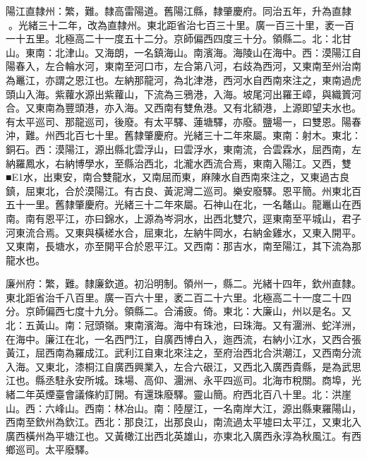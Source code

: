 \begin{pinyinscope}
陽江直隸州：繁，難。隸高雷陽道。舊陽江縣，隸肇慶府。同治五年，升為直隸。光緒三十二年，改為直隸州。東北距省治七百三十里。廣一百三十里，袤一百一十五里。北極高二十一度五十二分。京師偏西四度三十分。領縣二。北：北甘山。東南：北津山。又海朗，一名鎮海山。南濱海。海陵山在海中。西：漠陽江自陽春入，左合輪水河，東南至河口市，左合第八河，右歧為西河，又東南至州治南為鼉江，亦謂之恩江也。左納那龍河，為北津港，西河水自西南來注之，東南過虎頭山入海。紫蘿水源出紫蘿山，下流為三鴉港，入海。坡尾河出羅王嶂，與織篢河合。又東南為豐頭港，亦入海。又西南有雙魚港。又有北額港，上源即望夫水也。有太平巡司、那龍巡司，後廢。有太平驛、蓮塘驛，亦廢。鹽場一，曰雙恩。陽春沖，難。州西北百七十里。舊隸肇慶府。光緒三十二年來屬。東南：射木。東北：銅石。西：漠陽江，源出縣北雲浮山，曰雲浮水，東南流，合雲霖水，屈西南，左納羅鳳水，右納博學水，至縣治西北，北瀧水西流合焉，東南入陽江。又西，雙■E1水，出東安，南合雙龍水，又南屈而東，麻陳水自西南來注之，又東過古良鎮，屈東北，合於漠陽江。有古良、黃泥灣二巡司。樂安廢驛。恩平簡。州東北百五十一里。舊隸肇慶府。光緒三十二年來屬。石神山在北，一名鼇山。龍鼉山在西南。南有恩平江，亦曰錦水，上源為岑洞水，出西北雙穴，逕東南至平城山，君子河東流合焉。又東與橫槎水合，屈東北，左納牛岡水，右納金雞水，又東入開平。又東南，長塘水，亦至開平合於恩平江。又西南：那吉水，南至陽江，其下流為那龍水也。

廉州府：繁，難。隸廉欽道。初沿明制。領州一，縣二。光緒十四年，欽州直隸。東北距省治千八百里。廣一百六十里，袤二百二十六里。北極高二十一度二十四分。京師偏西七度十九分。領縣二。合浦疲。倚。東北：大廉山，州以是名。又北：五黃山。南：冠頭嶺。東南濱海。海中有珠池，曰珠海。又有潿洲、蛇洋洲，在海中。廉江在北，一名西門江，自廣西博白入，迤西流，右納小江水，又西合張黃江，屈西南為羅成江。武利江自東北來注之，至府治西北合洪潮江，又西南分流入海。又東北，漆桐江自廣西興業入，左合六硍江，又西北入廣西貴縣，是為武思江也。縣丞駐永安所城。珠場、高仰、潿洲、永平四巡司。北海市稅關。商埠，光緒二年英煙臺會議條約訂開。有還珠廢驛。靈山簡。府西北百八十里。北：洪崖山。西：六峰山。西南：林冶山。南：陸屋江，一名南岸大江，源出縣東羅陽山，西南至欽州為欽江。西北：那良江，出那良山，南流過太平墟曰太平江，又東北入廣西橫州為平塘江也。又黃橄江出西北英雄山，亦東北入廣西永淳為秋風江。有西鄉巡司。太平廢驛。


\end{pinyinscope}
